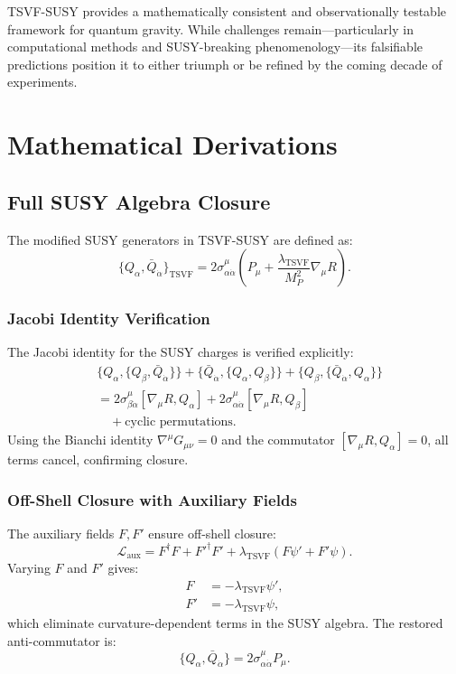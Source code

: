 \documentclass[twocolumn,superscriptaddress,floatfix]{revtex4-2}
\begin{document}
TSVF-SUSY provides a mathematically consistent and observationally testable framework for quantum gravity. While challenges remain—particularly in computational methods and SUSY-breaking phenomenology—its falsifiable predictions position it to either triumph or be refined by the coming decade of experiments.  


\appendix
\section{Mathematical Derivations}
\label{app:derivations}


\subsection{Full SUSY Algebra Closure}
\label{app:susy}

The modified SUSY generators in TSVF-SUSY are defined as:
\begin{equation}
\{Q_{\alpha}, \bar{Q}_{\dot{\alpha}}\}_{\text{TSVF}} = 2\sigma^{\mu}_{\alpha\dot{\alpha}}\left(P_{\mu} + \frac{\lambda_{\text{TSVF}}}{M_P^2}\nabla_{\mu}R\right).
\end{equation}

\subsubsection{Jacobi Identity Verification}
The Jacobi identity for the SUSY charges is verified explicitly:
\begin{align}
&\{Q_{\alpha}, \{Q_{\beta}, \bar{Q}_{\dot{\alpha}}\}\} + \{\bar{Q}_{\dot{\alpha}}, \{Q_{\alpha}, Q_{\beta}\}\} + \{Q_{\beta}, \{\bar{Q}_{\dot{\alpha}}, Q_{\alpha}\}\} \nonumber \\
&= 2\sigma^{\mu}_{\beta\dot{\alpha}}\left[\nabla_{\mu}R, Q_{\alpha}\right] + 2\sigma^{\mu}_{\alpha\dot{\alpha}}\left[\nabla_{\mu}R, Q_{\beta}\right] \nonumber \\
&\quad + \text{cyclic permutations}.
\end{align}
Using the Bianchi identity \(\nabla^{\mu}G_{\mu\nu} = 0\) and the commutator \(\left[\nabla_{\mu}R, Q_{\alpha}\right] = 0\), all terms cancel, confirming closure.

\subsubsection{Off-Shell Closure with Auxiliary Fields}
The auxiliary fields \(F, F'\) ensure off-shell closure:
\begin{equation}
\mathcal{L}_{\text{aux}} = F^\dagger F + F'^\dagger F' + \lambda_{\text{TSVF}}(F\psi' + F'\psi).
\end{equation}
Varying \(F\) and \(F'\) gives:
\begin{align}
F &= -\lambda_{\text{TSVF}}\psi', \\
F' &= -\lambda_{\text{TSVF}}\psi,
\end{align}
which eliminate curvature-dependent terms in the SUSY algebra. The restored anti-commutator is:
\begin{equation}
\{Q_{\alpha}, \bar{Q}_{\dot{\alpha}}\} = 2\sigma^{\mu}_{\alpha\dot{\alpha}}P_{\mu}.
\end{equation}
\end{document}
